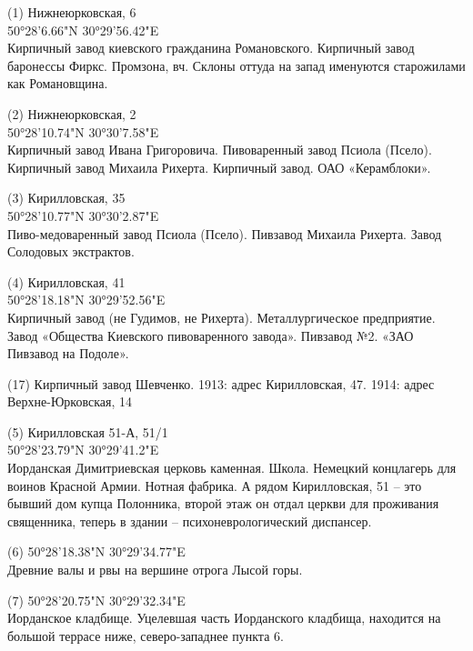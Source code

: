 \begin{flushleft}
(1) Нижнеюрковская, 6\\
 50°28'6.66"N 30°29'56.42"E\\
Кирпичный завод киевского гражданина Романовского. Кирпичный завод баронессы Фиркс. Промзона, вч. Склоны оттуда на запад именуются старожилами как Романовщина.

\medskip

(2) Нижнеюрковская, 2\\
50°28'10.74"N 30°30'7.58"E\\ Кирпичный завод Ивана Григоровича. Пивоваренный завод Псиола (Псело). Кирпичный завод Михаила Рихерта. Кирпичный завод. ОАО «Керамблоки».

\medskip

(3) Кирилловская, 35\\
50°28'10.77"N 30°30'2.87"E\\ Пиво-медоваренный завод Псиола (Псело). Пивзавод Михаила Рихерта. Завод Солодовых экстрактов.

\medskip

(4) Кирилловская, 41\\
50°28'18.18"N 30°29'52.56"E\\ Кирпичный завод (не Гудимов, не Рихерта). Металлургическое предприятие. Завод «Общества Киевского пивоваренного завода». Пивзавод №2. «ЗАО Пивзавод на Подоле».

\medskip

(17) Кирпичный завод Шевченко. 1913: адрес Кирилловская, 47. 1914: адрес Верхне-Юрковская, 14

\medskip
 
(5) Кирилловская 51-А, 51/1\\
50°28'23.79"N 30°29'41.2"E\\ Иорданская Димитриевская церковь каменная. Школа. Немецкий концлагерь для воинов Красной Армии. Нотная фабрика. А рядом Кирилловская, 51 – это бывший дом купца Полонника, второй этаж он отдал церкви для проживания священника, теперь в здании – психоневрологический диспансер.\\

\medskip

(6) 50°28'18.38"N 30°29'34.77"E\\
Древние валы и рвы на вершине отрога Лысой горы.\\

\medskip

(7) 50°28'20.75"N 30°29'32.34"E\\
Иорданское кладбище. Уцелевшая часть Иорданского кладбища, находится на большой террасе ниже, северо-западнее пункта 6.\\


\end{flushleft}

